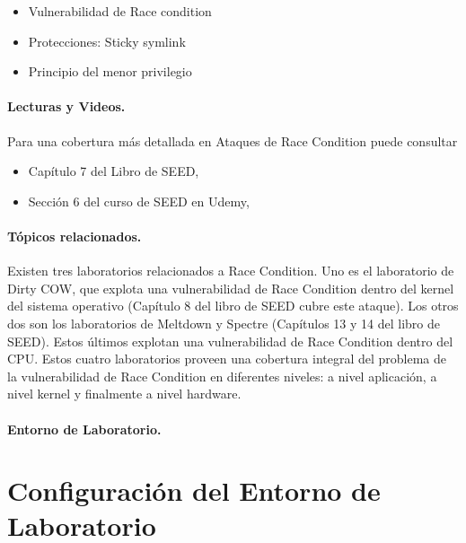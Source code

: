 \begin{itemize}[noitemsep]
\item Vulnerabilidad de Race condition
\item Protecciones: Sticky symlink
\item Principio del menor privilegio
\end{itemize}




\paragraph{Lecturas y Videos.}
Para una cobertura más detallada en Ataques de Race Condition puede consultar

\begin{itemize}
\item Capítulo 7 del Libro de SEED, \seedbook
\item Sección 6 del curso de SEED en Udemy, \seedcsvideo
\end{itemize}


\paragraph{Tópicos relacionados.}
Existen tres laboratorios relacionados a Race Condition. Uno es el laboratorio de Dirty COW, que explota una vulnerabilidad de Race Condition dentro del kernel del sistema operativo (Capítulo 8 del libro de SEED cubre este ataque). Los otros dos son los laboratorios de Meltdown y Spectre (Capítulos 13 y 14 del libro de SEED). Estos últimos explotan una vulnerabilidad de Race Condition dentro del CPU. Estos cuatro laboratorios proveen una cobertura integral del problema de la vulnerabilidad de Race Condition en diferentes niveles: a nivel aplicación, a nivel kernel y finalmente a nivel hardware.


\paragraph{Entorno de Laboratorio.} \seedenvironmentC


\section{Configuración del Entorno de Laboratorio}


